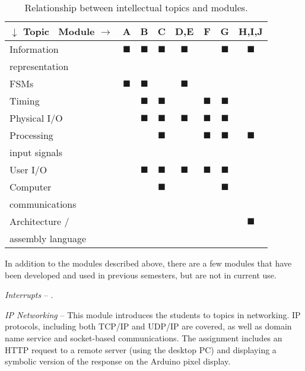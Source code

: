 \begin{table}[ht]
\caption{Relationship between intellectual topics and modules.}
\label{tbl:topics}
\centering
\begin{tabular}{l | c | c | c | c | c | c | c}
$\downarrow$ Topic \ Module $\rightarrow$ & A & B & C & D,E & F & G & H,I,J \\ \hline
Information & $\blacksquare$ & $\blacksquare$ & $\blacksquare$ & $\blacksquare$ & & $\blacksquare$ & $\blacksquare$ \\
    representation & & & & & & &\\ \hline
FSMs & $\blacksquare$ & $\blacksquare$ & & $\blacksquare$ & & & \\ \hline
Timing & & $\blacksquare$ & $\blacksquare$ & & $\blacksquare$ & $\blacksquare$ & \\ \hline
Physical I/O & & $\blacksquare$ & $\blacksquare$ & $\blacksquare$ & $\blacksquare$ & $\blacksquare$ & \\ \hline
Processing & & & $\blacksquare$ & & $\blacksquare$ & $\blacksquare$ & $\blacksquare$ \\
    input signals & & & & & & &\\ \hline
User I/O & & $\blacksquare$ & $\blacksquare$ & $\blacksquare$ & $\blacksquare$ & $\blacksquare$ & \\ \hline
Computer & & & $\blacksquare$ & & & $\blacksquare$ & \\
    communications & & & & & & &\\ \hline
Architecture / & & & & & & & $\blacksquare$ \\
    assembly language & & & & & & & \\
\end{tabular}
\end{table}

In addition to the modules described above, there are a few modules that
have been developed and used in previous semesters, but are not in current use.

\emph{Interrupts} --
.

\emph{IP Networking} --
This module introduces the students to topics in networking.  IP protocols,
including both TCP/IP and UDP/IP are covered, as well as domain name service
and socket-based communications. The assignment includes an HTTP request
to a remote server (using the desktop PC) and displaying a symbolic version
of the response on the Arduino pixel display.
